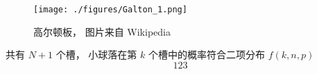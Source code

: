 

\begin{figure}[ht]
\centering
\texttt{[image: ./figures/Galton\_1.png]}
\caption{高尔顿板， 图片来自 Wikipedia} \label{Galton_fig1}
\end{figure}

共有 $N+1$ 个槽， 小球落在第 $k$ 个槽中的概率符合二项分布 $f(k,n,p)$
\begin{equation}
123
\end{equation}

